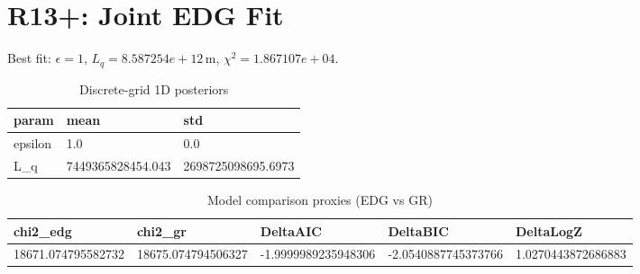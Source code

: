 \section{R13+: Joint EDG Fit}
Best fit: $\epsilon = 1$, $L_q = 8.587254e+12\,\mathrm{m}$, $\chi^2 = 1.867107e+04$.
\begin{table}[h!]
\centering
\caption{Discrete-grid 1D posteriors}
\label{tab:r13p_marg}
\begin{tabular}{l | l | l}
\hline
param & mean & std \\
\hline
epsilon & 1.0 & 0.0 \\
L_q & 7449365828454.043 & 2698725098695.6973 \\
\hline
\end{tabular}
\end{table}

\begin{table}[h!]
\centering
\caption{Model comparison proxies (EDG vs GR)}
\label{tab:r13p_model}
\begin{tabular}{l | l | l | l | l}
\hline
chi2_edg & chi2_gr & DeltaAIC & DeltaBIC & DeltaLogZ \\
\hline
18671.074795582732 & 18675.074794506327 & -1.9999989235948306 & -2.0540887745373766 & 1.0270443872686883 \\
\hline
\end{tabular}
\end{table}

